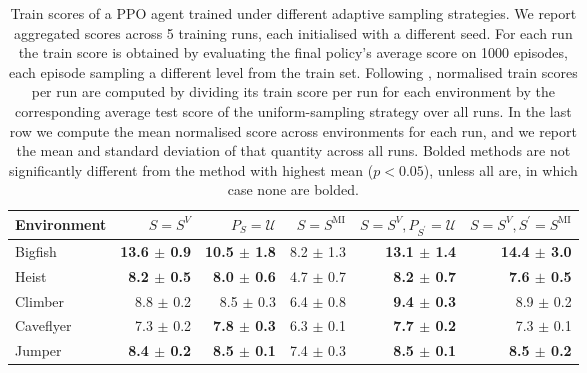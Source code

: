 \begin{table}[H]
\caption{Train scores of a PPO agent trained under different adaptive sampling strategies. We report aggregated scores across 5 training runs, each initialised with a different seed. For each run the train score is obtained by evaluating the final policy’s average score on 1000 episodes, each episode sampling a different level from the train set. Following \cite{raileanu2021UCB-DrAC}, normalised train scores per run are computed by dividing its train score per run for each environment by the corresponding average test score of the uniform-sampling strategy over all runs. In the last row we compute the mean normalised score across environments for each run, and we report the mean and standard deviation of that quantity across all runs. Bolded methods are not significantly different from the method with highest mean ($p<0.05$), unless all are, in which case none are bolded.}
\label{c3:tb:procgen_train_scores}
\vskip 0.15in
\begin{center}
\begin{small}
\begin{sc}
\begin{adjustbox}{max width=\linewidth}
\begin{tabular}{lrrrrr}
\toprule
                 Environment &                  $S=S^V$ &       $P_S=\mathcal{U}$ &    $S=S^{\mathrm{MI}}$ & $S=S^V, P_{S^\prime}=\mathcal{U}$ & $S=S^V, S^\prime=S^{\mathrm{MI}}$ \\
\midrule
                     Bigfish &  \textbf{13.6 $\pm$ 0.9} & \textbf{10.5 $\pm$ 1.8} &          8.2 $\pm$ 1.3 &           \textbf{13.1 $\pm$ 1.4} &           \textbf{14.4 $\pm$ 3.0} \\
                       Heist &   \textbf{8.2 $\pm$ 0.5} &  \textbf{8.0 $\pm$ 0.6} &          4.7 $\pm$ 0.7 &            \textbf{8.2 $\pm$ 0.7} &            \textbf{7.6 $\pm$ 0.5} \\
                     Climber &            8.8 $\pm$ 0.2 &           8.5 $\pm$ 0.3 &          6.4 $\pm$ 0.8 &            \textbf{9.4 $\pm$ 0.3} &                     8.9 $\pm$ 0.2 \\
                   Caveflyer &            7.3 $\pm$ 0.2 &  \textbf{7.8 $\pm$ 0.3} &          6.3 $\pm$ 0.1 &            \textbf{7.7 $\pm$ 0.2} &                     7.3 $\pm$ 0.1 \\
                      Jumper &   \textbf{8.4 $\pm$ 0.2} &  \textbf{8.5 $\pm$ 0.1} &          7.4 $\pm$ 0.3 &            \textbf{8.5 $\pm$ 0.1} &            \textbf{8.5 $\pm$ 0.2} \\

\end{tabular}
\end{adjustbox}
\end{sc}
\end{small}
\end{center}
\end{table}
